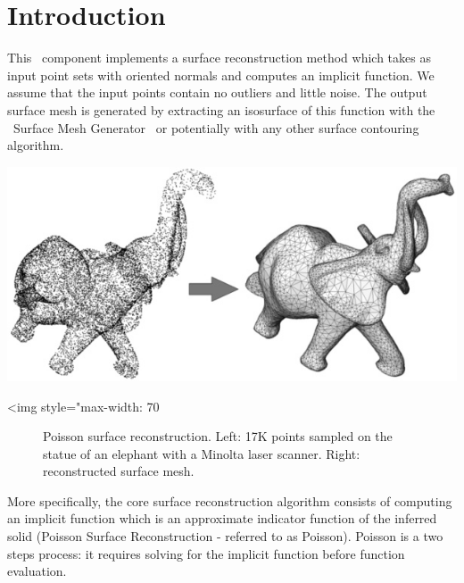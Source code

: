 \section{Introduction}

This \cgal\ component implements a surface reconstruction method which takes as input point sets with oriented normals and computes an implicit function. We assume that the input points contain no outliers and little noise. The output surface mesh is generated by extracting an isosurface of this function with the \cgal\ Surface Mesh Generator~\cite{cgal:ry-gsddrm-06} or potentially with any other surface contouring algorithm.

\begin{center}
    \begin{ccTexOnly}
        \includegraphics[width=1.0\textwidth]{Surface_reconstruction_points_3/introduction} %
    \end{ccTexOnly}
    \begin{ccHtmlOnly}
        <img style="max-width: 70%
    \end{ccHtmlOnly}
    \begin{figure}[h]
        \caption{Poisson surface reconstruction.
                 Left: 17K points sampled on the statue of an
                 elephant with a Minolta laser scanner.
                 Right: reconstructed surface mesh.}
        \label{Surface_reconstruction_points_3-fig-introduction}
    \end{figure}
\end{center}

More specifically, the core surface reconstruction algorithm consists of computing an implicit function which is an approximate indicator function of the inferred solid (Poisson Surface Reconstruction - referred to as Poisson). Poisson is a two steps process: it requires solving for the implicit function before function evaluation.


